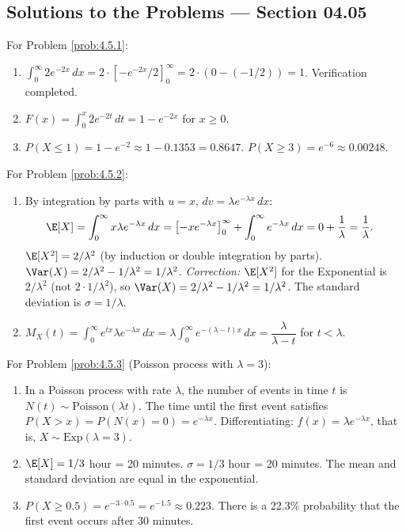 \subsection*{Solutions to the Problems --- Section 04.05}

\begin{solucion}
	\label{sol:4.5.1}
	For Problem \ref{prob:4.5.1}:
	\begin{enumerate}
		\item $\int_{0}^{\infty} 2e^{-2x}\,dx = 2 \cdot [-e^{-2x}/2]_{0}^{\infty} = 2 \cdot (0 - (-1/2)) = 1$. Verification completed.
		\item $F(x) = \int_{0}^{x} 2e^{-2t}\,dt = 1 - e^{-2x}$ for $x \ge 0$.
		\item $P(X \le 1) = 1 - e^{-2} \approx 1 - 0.1353 = 0.8647$. $P(X \ge 3) = e^{-6} \approx 0.00248$.
	\end{enumerate}
\end{solucion}

\begin{solucion}
	\label{sol:4.5.2}
	For Problem \ref{prob:4.5.2}:
	\begin{enumerate}
		\item By integration by parts with $u = x$, $dv = \lambda e^{-\lambda x}\,dx$:
		\begin{align*}
			\E[X] &= \int_{0}^{\infty} x \lambda e^{-\lambda x}\,dx = \left[ -x e^{-\lambda x} \right]_{0}^{\infty} + \int_{0}^{\infty} e^{-\lambda x}\,dx = 0 + \frac{1}{\lambda} = \frac{1}{\lambda}.
		\end{align*}
		$\E[X^{2}] = 2/\lambda^{2}$ (by induction or double integration by parts). $\Var(X) = 2/\lambda^{2} - 1/\lambda^{2} = 1/\lambda^{2}$. \emph{Correction:} $\E[X^{2}]$ for the Exponential is $2/\lambda^{2}$ (not $2 \cdot 1/\lambda^{2}$), so $\Var(X) = 2/\lambda^{2} - 1/\lambda^{2} = 1/\lambda^{2}$. The standard deviation is $\sigma = 1/\lambda$.
		\item $M_{X}(t) = \int_{0}^{\infty} e^{tx} \lambda e^{-\lambda x}\,dx = \lambda \int_{0}^{\infty} e^{-(\lambda - t)x}\,dx = \dfrac{\lambda}{\lambda - t}$ for $t < \lambda$.
	\end{enumerate}
\end{solucion}

\begin{solucion}
	\label{sol:4.5.3}
	For Problem \ref{prob:4.5.3} (Poisson process with $\lambda = 3$):
	\begin{enumerate}
		\item In a Poisson process with rate $\lambda$, the number of events in time $t$ is $N(t) \sim \text{Poisson}(\lambda t)$. The time until the first event satisfies $P(X > x) = P(N(x) = 0) = e^{-\lambda x}$. Differentiating: $f(x) = \lambda e^{-\lambda x}$, that is, $X \sim \text{Exp}(\lambda = 3)$.
		\item $\E[X] = 1/3$ hour = 20 minutes. $\sigma = 1/3$ hour = 20 minutes. The mean and standard deviation are equal in the exponential.
		\item $P(X \ge 0.5) = e^{-3 \cdot 0.5} = e^{-1.5} \approx 0.223$. There is a 22.3\% probability that the first event occurs after 30 minutes.
	\end{enumerate}
\end{solucion}

